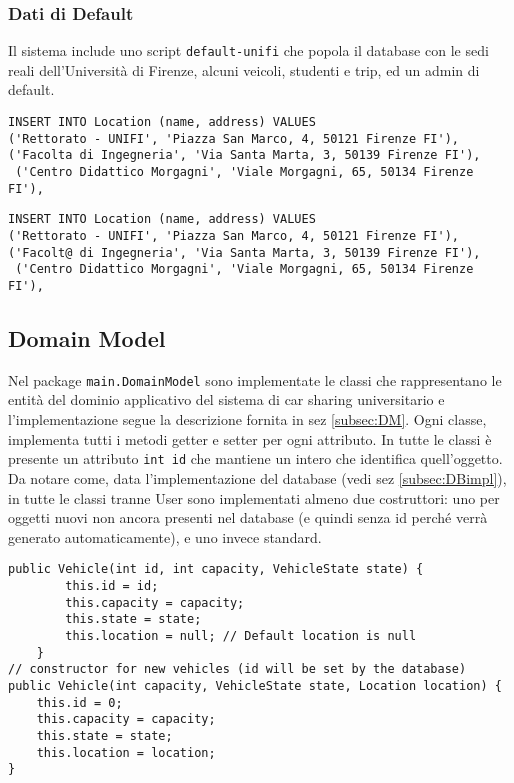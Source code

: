 \subsubsection{Dati di Default}
Il sistema include uno script \texttt{default-unifi} che popola il database con le sedi reali dell'Università di Firenze, alcuni veicoli, studenti e trip, ed un admin di default.
\begin{lstlisting}[style=sql, caption={Esempio inserimento dati di default per le location}]
INSERT INTO Location (name, address) VALUES
('Rettorato - UNIFI', 'Piazza San Marco, 4, 50121 Firenze FI'),
('Facolta di Ingegneria', 'Via Santa Marta, 3, 50139 Firenze FI'),
 ('Centro Didattico Morgagni', 'Viale Morgagni, 65, 50134 Firenze FI'),
\end{lstlisting}
\begin{lstlisting}[style=sql, caption={Esempio inserimento dati di default per le location}]
INSERT INTO Location (name, address) VALUES
('Rettorato - UNIFI', 'Piazza San Marco, 4, 50121 Firenze FI'),
('Facolt@ di Ingegneria', 'Via Santa Marta, 3, 50139 Firenze FI'),
 ('Centro Didattico Morgagni', 'Viale Morgagni, 65, 50134 Firenze FI'),
\end{lstlisting}

\subsection{Domain Model}
Nel package \texttt{main.DomainModel} sono implementate le classi che rappresentano le entità del dominio applicativo del sistema di car sharing universitario e  l'implementazione segue la descrizione fornita in sez \ref{subsec:DM}. Ogni classe, implementa tutti i metodi getter e setter per ogni attributo.
In tutte le classi è presente un attributo \texttt{int id} che mantiene un intero che identifica quell'oggetto.\\
Da notare come, data l'implementazione del database (vedi sez \ref{subsec:DBimpl}), in tutte le classi tranne User sono implementati almeno due costruttori: uno per oggetti nuovi non ancora presenti nel database (e quindi senza id perché verrà generato automaticamente), e uno invece standard.
\begin{lstlisting}[style=java, caption={Esempio di costruttori della classe Vehicle}]
public Vehicle(int id, int capacity, VehicleState state) {
        this.id = id;
        this.capacity = capacity;
        this.state = state;
        this.location = null; // Default location is null
    }
// constructor for new vehicles (id will be set by the database)
public Vehicle(int capacity, VehicleState state, Location location) {
    this.id = 0;
    this.capacity = capacity;
    this.state = state;
    this.location = location;
}
\end{lstlisting}

